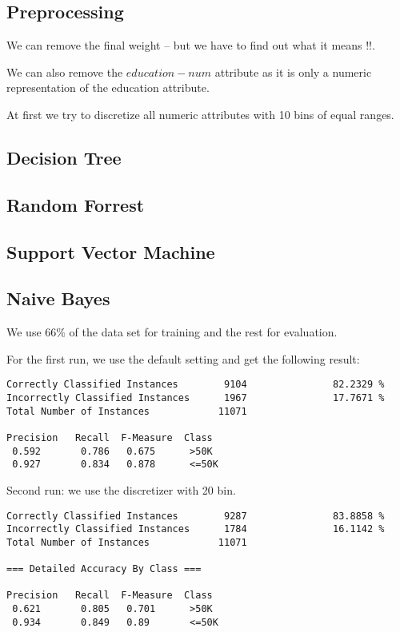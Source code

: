 \documentclass[paper=a4, fontsize=11pt]{scrartcl} %
\numberwithin{equation}{section} %
\numberwithin{figure}{section} %
\numberwithin{table}{section} %
\begin{document}
\subsection{Preprocessing}

We can remove the final weight -- but we have to find out what it means !!.

We can also remove the $education-num$ attribute as it is only a numeric representation of the education attribute.

At first we try to discretize all numeric attributes with 10 bins of equal ranges.

\subsection{Decision Tree}

\subsection{Random Forrest}

\subsection{Support Vector Machine}

\subsection{Naive Bayes}

We use 66\% of the data set for training and the rest for evaluation.

For the first run, we use the default setting and get the following result:

\begin{verbatim}
Correctly Classified Instances        9104               82.2329 %
Incorrectly Classified Instances      1967               17.7671 %
Total Number of Instances            11071     

Precision   Recall  F-Measure  Class
 0.592       0.786   0.675      >50K
 0.927       0.834   0.878      <=50K
\end{verbatim}

Second run: we use the discretizer with 20 bin.

\begin{verbatim}
Correctly Classified Instances        9287               83.8858 %
Incorrectly Classified Instances      1784               16.1142 %
Total Number of Instances            11071     

=== Detailed Accuracy By Class ===

Precision   Recall  F-Measure  Class
 0.621       0.805   0.701      >50K
 0.934       0.849   0.89       <=50K
\end{verbatim}
\end{document}
